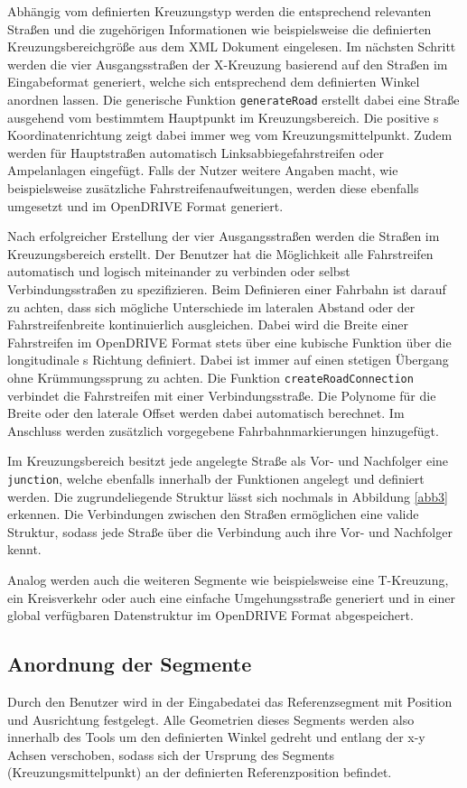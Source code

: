 Abhängig vom definierten Kreuzungstyp werden die entsprechend relevanten Straßen und die zugehörigen Informationen wie beispielsweise die definierten Kreuzungsbereichgröße aus dem XML Dokument eingelesen. Im nächsten Schritt werden die vier Ausgangsstraßen der X-Kreuzung basierend auf den Straßen im Eingabeformat generiert, welche sich entsprechend dem definierten Winkel anordnen lassen. Die generische Funktion \texttt{generateRoad} erstellt dabei eine Straße ausgehend vom bestimmtem Hauptpunkt im Kreuzungsbereich. Die positive s Koordinatenrichtung zeigt dabei immer weg vom Kreuzungsmittelpunkt. Zudem werden für Hauptstraßen automatisch Linksabbiegefahrstreifen oder Ampelanlagen eingefügt. Falls der Nutzer weitere Angaben macht, wie beispielsweise zusätzliche Fahrstreifenaufweitungen, werden diese ebenfalls umgesetzt und im OpenDRIVE Format generiert.

Nach erfolgreicher Erstellung der vier Ausgangsstraßen werden die Straßen im Kreuzungsbereich erstellt. Der Benutzer hat die Möglichkeit alle Fahrstreifen automatisch und logisch miteinander zu verbinden oder selbst Verbindungsstraßen zu spezifizieren. Beim Definieren einer Fahrbahn ist darauf zu achten, dass sich mögliche Unterschiede im lateralen Abstand oder der Fahrstreifenbreite kontinuierlich ausgleichen. Dabei wird die Breite einer Fahrstreifen im OpenDRIVE Format stets über eine kubische Funktion über die longitudinale s Richtung definiert. Dabei ist immer auf einen stetigen Übergang ohne Krümmungssprung zu achten. Die Funktion \texttt{createRoadConnection} verbindet die Fahrstreifen mit einer Verbindungsstraße. Die Polynome für die Breite oder den laterale Offset werden dabei automatisch berechnet. Im Anschluss werden zusätzlich vorgegebene Fahrbahnmarkierungen hinzugefügt.

Im Kreuzungsbereich besitzt jede angelegte Straße als Vor- und Nachfolger eine \texttt{junction}, welche ebenfalls innerhalb der Funktionen angelegt und definiert werden. Die zugrundeliegende Struktur lässt sich nochmals in Abbildung \ref{abb3} erkennen. Die Verbindungen zwischen den Straßen ermöglichen eine valide Struktur, sodass jede Straße über die Verbindung auch ihre Vor- und Nachfolger kennt.

Analog werden auch die weiteren Segmente wie beispielsweise eine T-Kreuzung, ein Kreisverkehr oder auch eine einfache Umgehungsstraße generiert und in einer global verfügbaren Datenstruktur im OpenDRIVE Format abgespeichert.

\subsection{Anordnung der Segmente}
Durch den Benutzer wird in der Eingabedatei das Referenzsegment mit Position und Ausrichtung festgelegt. Alle Geometrien dieses Segments werden also innerhalb des Tools um den definierten Winkel gedreht und entlang der x-y Achsen verschoben, sodass sich der Ursprung des Segments (Kreuzungsmittelpunkt) an der definierten Referenzposition befindet.

